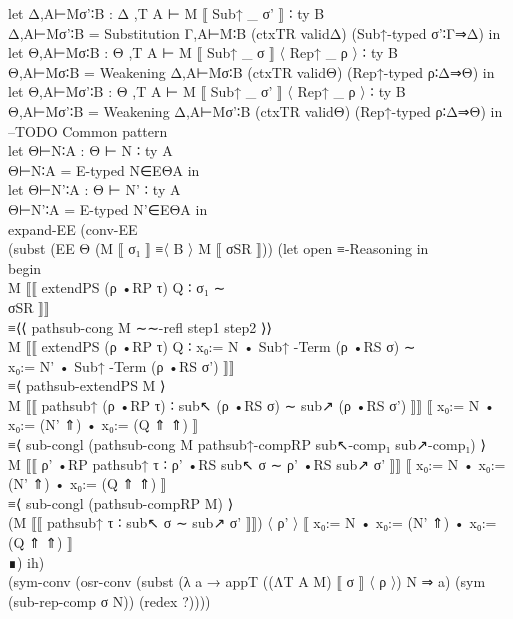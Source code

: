 {\begin{code}
{\>    let Δ,A⊢Mσ'∶B : Δ ,T A ⊢ M ⟦ Sub↑ \_ σ' ⟧ ∶ ty B\<\\
\>        Δ,A⊢Mσ'∶B = Substitution Γ,A⊢M∶B (ctxTR validΔ) (Sub↑-typed σ'∶Γ⇒Δ) in\<\\
\>    let Θ,A⊢Mσ∶B : Θ ,T A ⊢ M ⟦ Sub↑ \_ σ ⟧ 〈 Rep↑ \_ ρ 〉 ∶ ty B\<\\
\>        Θ,A⊢Mσ∶B = Weakening Δ,A⊢Mσ∶B (ctxTR validΘ) (Rep↑-typed ρ∶Δ⇒Θ) in\<\\
\>    let Θ,A⊢Mσ'∶B : Θ ,T A ⊢ M ⟦ Sub↑ \_ σ' ⟧ 〈 Rep↑ \_ ρ 〉 ∶ ty B\<\\
\>        Θ,A⊢Mσ'∶B = Weakening Δ,A⊢Mσ'∶B (ctxTR validΘ) (Rep↑-typed ρ∶Δ⇒Θ) in --TODO Common pattern\<\\
\>    let Θ⊢N∶A : Θ ⊢ N ∶ ty A\<\\
\>        Θ⊢N∶A = E-typed N∈EΘA in\<\\
\>    let Θ⊢N'∶A : Θ ⊢ N' ∶ ty A\<\\
\>        Θ⊢N'∶A = E-typed N'∈EΘA in\<\\
\>        expand-EE (conv-EE \<\\
\>          (subst (EE Θ (M ⟦ σ₁ ⟧ ≡〈 B 〉 M ⟦ σSR ⟧)) (let open ≡-Reasoning in\<\\
\>          begin\<\\
\>            M ⟦⟦ extendPS (ρ •RP τ) Q ∶ σ₁ ∼\<\\
\>                 σSR ⟧⟧\<\\
\>          ≡⟨⟨ pathsub-cong M ∼∼-refl step1 step2 ⟩⟩\<\\
\>            M ⟦⟦ extendPS (ρ •RP τ) Q ∶ x₀:= N • Sub↑ -Term (ρ •RS σ) ∼\<\\
\>                 x₀:= N' • Sub↑ -Term (ρ •RS σ') ⟧⟧\<\\
\>          ≡⟨ pathsub-extendPS M ⟩\<\\
\>            M ⟦⟦ pathsub↑ (ρ •RP τ) ∶ sub↖ (ρ •RS σ) ∼ sub↗ (ρ •RS σ') ⟧⟧ ⟦ x₀:= N • x₀:= (N' ⇑) • x₀:= (Q ⇑ ⇑) ⟧\<\\
\>          ≡⟨ sub-congl (pathsub-cong M pathsub↑-compRP sub↖-comp₁ sub↗-comp₁) ⟩\<\\
\>            M ⟦⟦ ρ' •RP pathsub↑ τ ∶ ρ' •RS sub↖ σ ∼ ρ' •RS sub↗ σ' ⟧⟧ ⟦ x₀:= N • x₀:= (N' ⇑) • x₀:= (Q ⇑ ⇑) ⟧\<\\
\>          ≡⟨ sub-congl (pathsub-compRP M) ⟩\<\\
\>            (M ⟦⟦ pathsub↑ τ ∶ sub↖ σ ∼ sub↗ σ' ⟧⟧) 〈 ρ' 〉 ⟦ x₀:= N • x₀:= (N' ⇑) • x₀:= (Q ⇑ ⇑) ⟧\<\\
\>          ∎) ih) \<\\
\>          (sym-conv (osr-conv (subst (λ a → appT ((ΛT A M) ⟦ σ ⟧ 〈 ρ 〉) N ⇒ a) (sym (sub-rep-comp σ N)) (redex ?)))) \<\\
}
\end{code}}
